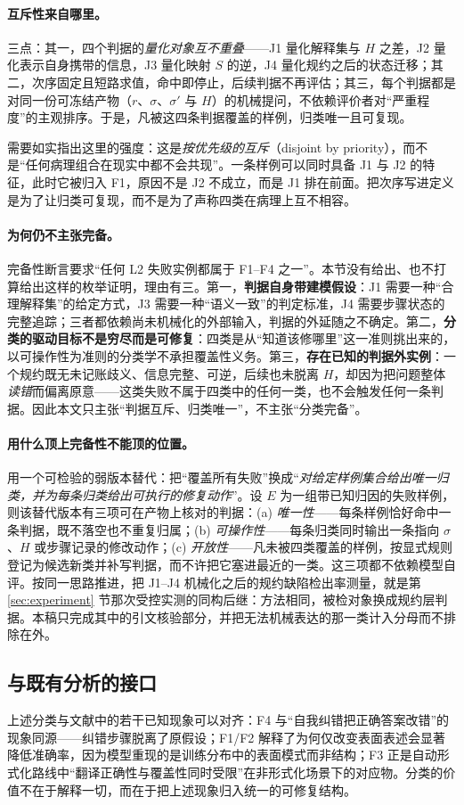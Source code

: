 \paragraph{互斥性来自哪里。}三点：其一，四个判据的\emph{量化对象互不重叠}——J1 量化解释集与 $H$ 之差，J2 量化表示自身携带的信息，J3 量化映射 $S$ 的逆，J4 量化规约之后的状态迁移；其二，次序固定且短路求值，命中即停止，后续判据不再评估；其三，每个判据都是对同一份可冻结产物（$r$、$\sigma$、$\sigma'$ 与 $H$）的机械提问，不依赖评价者对“严重程度”的主观排序。于是，凡被这四条判据覆盖的样例，归类唯一且可复现。

需要如实指出这里的强度：这是\emph{按优先级的互斥}（disjoint by priority），而不是“任何病理组合在现实中都不会共现”。一条样例可以同时具备 J1 与 J2 的特征，此时它被归入 F1，原因不是 J2 不成立，而是 J1 排在前面。把次序写进定义是为了让归类可复现，而不是为了声称四类在病理上互不相容。

\paragraph{为何仍不主张完备。}完备性断言要求“任何 L2 失败实例都属于 F1--F4 之一”。本节没有给出、也不打算给出这样的枚举证明，理由有三。第一，\textbf{判据自身带建模假设}：J1 需要一种“合理解释集”的给定方式，J3 需要一种“语义一致”的判定标准，J4 需要步骤状态的完整追踪；三者都依赖尚未机械化的外部输入，判据的外延随之不确定。第二，\textbf{分类的驱动目标不是穷尽而是可修复}：四类是从“知道该修哪里”这一准则挑出来的，以可操作性为准则的分类学不承担覆盖性义务。第三，\textbf{存在已知的判据外实例}：一个规约既无未记账歧义、信息完整、可逆，后续也未脱离 $H$，却因为把问题整体\emph{读错}而偏离原意——这类失败不属于四类中的任何一类，也不会触发任何一条判据。因此本文只主张“判据互斥、归类唯一”，不主张“分类完备”。

\paragraph{用什么顶上完备性不能顶的位置。}用一个可检验的弱版本替代：把“覆盖所有失败”换成“\emph{对给定样例集合给出唯一归类，并为每条归类给出可执行的修复动作}”。设 $E$ 为一组带已知归因的失败样例，则该替代版本有三项可在产物上核对的判据：(a) \emph{唯一性}——每条样例恰好命中一条判据，既不落空也不重复归属；(b) \emph{可操作性}——每条归类同时输出一条指向 $\sigma$、$H$ 或步骤记录的修改动作；(c) \emph{开放性}——凡未被四类覆盖的样例，按显式规则登记为候选新类并补写判据，而不许把它塞进最近的一类。这三项都不依赖模型自评。按同一思路推进，把 J1--J4 机械化之后的规约缺陷检出率测量，就是第 \ref{sec:experiment} 节那次受控实测的同构后继：方法相同，被检对象换成规约层判据。本稿只完成其中的引文核验部分，并把无法机械表达的那一类计入分母而不排除在外。

\subsection{与既有分析的接口}

上述分类与文献中的若干已知现象可以对齐：F4 与“自我纠错把正确答案改错”的现象同源\citep{huang2023large}——纠错步骤脱离了原假设；F1/F2 解释了为何仅改变表面表述会显著降低准确率\citep{mirzadeh2024gsm}，因为模型重现的是训练分布中的表面模式而非结构；F3 正是自动形式化路线中“翻译正确性与覆盖性同时受限”在非形式化场景下的对应物\citep{szegedy2020promising,wu2022autoformalization}。分类的价值不在于解释一切，而在于把上述现象归入统一的可修复结构。
